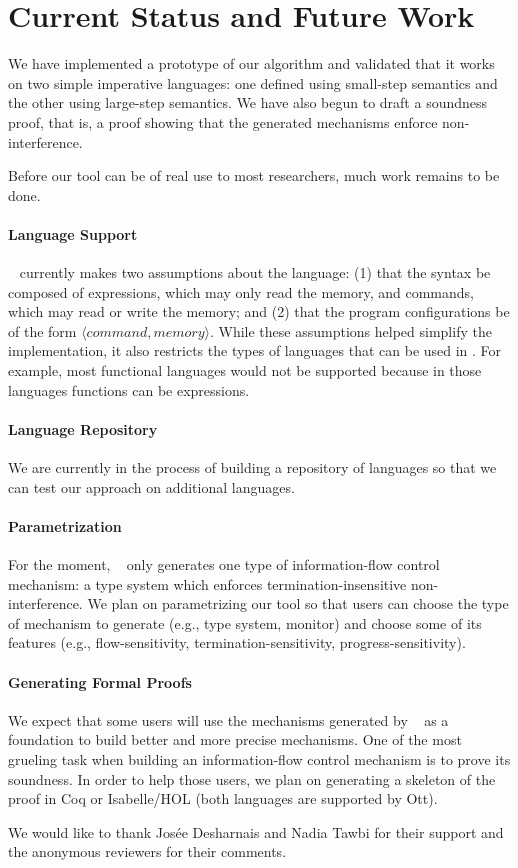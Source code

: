 \documentclass[sigplan,10pt]{acmart}\settopmatter{printfolios=true,printccs=false,printacmref=false}
\begin{document}
\section{Current Status and Future Work}
We have implemented a prototype of our algorithm and validated that it works on two simple imperative languages: one defined using small-step semantics and the other using large-step semantics. We have also begun to draft a soundness proof, that is, a proof showing that the generated mechanisms enforce non-interference.

Before our tool can be of real use to most researchers, much work remains to be done.

\paragraph{Language Support} \ottifc~ currently makes two assumptions about the language: (1) that the syntax be composed of expressions, which may only read the memory, and commands, which may read or write the memory; and (2) that the program configurations be of the form $\langle command, memory\rangle$. While these assumptions helped simplify the implementation, it also restricts the types of languages that can be used in \ottifc. For example, most functional languages would not be supported because in those languages functions can be expressions. 

\paragraph{Language Repository} We are currently in the process of building a repository of languages so that we can test our approach on additional languages. 

\paragraph{Parametrization} For the moment, \ottifc~ only generates one type of information-flow control mechanism: a type system which enforces termination-insensitive non-interference. We plan on parametrizing our tool so that users can choose the type of mechanism to generate (e.g., type system, monitor) and choose some of its features (e.g., flow-sensitivity, termination-sensitivity, progress-sensitivity).

\paragraph{Generating Formal Proofs} We expect that some users will use the mechanisms generated by \ottifc~ as a foundation to build better and more precise mechanisms. One of the most grueling task when building an information-flow control mechanism is to prove its soundness. In order to help those users, we plan on generating a skeleton of the proof in Coq or Isabelle/HOL (both languages are supported by Ott).

\begin{acks}
We would like to thank Josée Desharnais and Nadia Tawbi for their support and the anonymous reviewers for their comments.
\end{acks}


\end{document}
